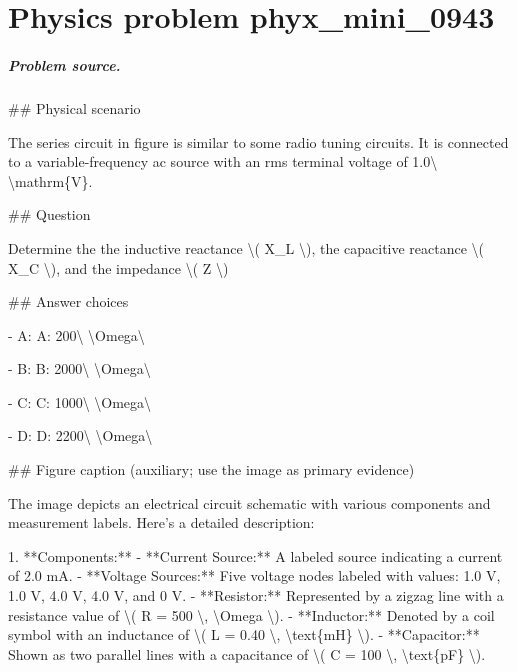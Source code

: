 
\chapter{Physics problem phyx\_mini\_0943}
\label{ch:PhyXMiniProblems_problem_phyx_mini_0943}

\paragraph{Problem source.}
\#\# Physical scenario

The series circuit in figure is similar to some radio tuning circuits. It is connected to a variable-frequency ac source with an rms terminal voltage of 1.0\textbackslash{} \textbackslash{}mathrm\{V\}.

\#\# Question

Determine the the inductive reactance \textbackslash{}( X\_L \textbackslash{}), the capacitive reactance \textbackslash{}( X\_C \textbackslash{}), and the impedance \textbackslash{}( Z \textbackslash{})

\#\# Answer choices

- A: A: 200\textbackslash{} \textbackslash{}Omega\textbackslash{}

- B: B: 2000\textbackslash{} \textbackslash{}Omega\textbackslash{}

- C: C: 1000\textbackslash{} \textbackslash{}Omega\textbackslash{}

- D: D: 2200\textbackslash{} \textbackslash{}Omega\textbackslash{}

\#\# Figure caption (auxiliary; use the image as primary evidence)

The image depicts an electrical circuit schematic with various components and measurement labels. Here's a detailed description:

1. **Components:**
   - **Current Source:** A labeled source indicating a current of 2.0 mA.
   - **Voltage Sources:** Five voltage nodes labeled with values: 1.0 V, 1.0 V, 4.0 V, 4.0 V, and 0 V.
   - **Resistor:** Represented by a zigzag line with a resistance value of \textbackslash{}( R = 500 \textbackslash{}, \textbackslash{}Omega \textbackslash{}).
   - **Inductor:** Denoted by a coil symbol with an inductance of \textbackslash{}( L = 0.40 \textbackslash{}, \textbackslash{}text\{mH\} \textbackslash{}).
   - **Capacitor:** Shown as two parallel lines with a capacitance of \textbackslash{}( C = 100 \textbackslash{}, \textbackslash{}text\{pF\} \textbackslash{}).

